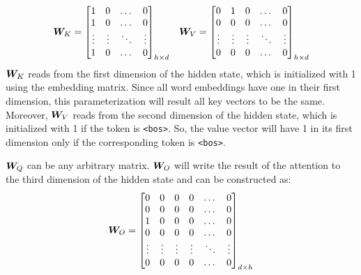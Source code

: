 \documentclass{article}
\begin{document}
\begin{align}
  \label{eq:abs_key_value}
  \begin{array}{ccc}
    {\bm{W}}_K = \begin{bmatrix}
              1      & 0      & \dots  & 0      \\
              1      & 0      & \dots  & 0      \\
              \vdots & \vdots & \ddots & \vdots \\
              1      & 0      & \dots  & 0
            \end{bmatrix}_{h \times d} &
    {\bm{W}}_V = \begin{bmatrix}
              0      & 1      & 0      & \dots  & 0      \\
              0      & 0      & 0      & \dots  & 0      \\
              \vdots & \vdots & \vdots & \ddots & \vdots \\
              0      & 0      & 0      & \dots  & 0
            \end{bmatrix}_{h \times d}
  \end{array}
\end{align}
${\bm{W}}_K$ reads from the first dimension of the hidden state, which is initialized with 1 using the embedding matrix. Since all word embeddings have one in their first dimension, this parameterization will result all key vectors to be the same. Moreover, ${\bm{W}}_V$ reads from the second dimension of the hidden state, which is initialized with 1 if the token is \texttt{<bos>}. So, the value vector will have 1 in its first dimension only if the corresponding token is \texttt{<bos>}.

${\bm{W}}_Q$ can be any arbitrary matrix. ${\bm{W}}_O$ will write the result of the attention to the third dimension of the hidden state and can be constructed as:
\begin{align}
  \label{eq:abs_output}
  {\bm{W}}_O = \begin{bmatrix}
            0      & 0      & 0      & 0      & \dots  & 0      \\
            0      & 0      & 0      & 0      & \dots  & 0      \\
            1      & 0      & 0      & 0      & \dots  & 0      \\
            0      & 0      & 0      & 0      & \dots  & 0      \\
            \vdots & \vdots & \vdots & \vdots & \ddots & \vdots \\
            0      & 0      & 0      & 0      & \dots  & 0
          \end{bmatrix}_{d \times h}
\end{align}
\end{document}
